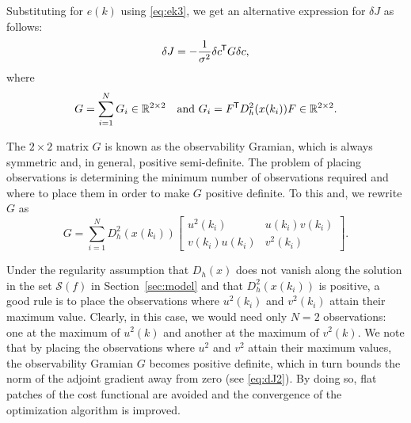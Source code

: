 \documentclass{article}
\newcommand*{\tran}{^{\mkern-1.5mu\mathsf{T}}}
\begin{document}
Substituting for $e(k)$ using \cref{eq:ek3}, we get an \textcolor{rev}{alternative} expression for $\delta J$ as follows:
\begin{equation}
    \delta J = - \dfrac{1}{\sigma^2} \delta c\tran G \delta c, \label{eq:dJ2}
\end{equation}
where
\begin{equation}
    G = \sum_{i=1}^{N} G_i \in \mathbb{R}^{2\times 2} \quad \text{and } G_i = F\tran D_h^2(x(k_i)) F \in \mathbb{R}^{2\times 2}. \label{eq:G}
\end{equation}

The $2\times 2$ matrix $G$ is known as the observability Gramian, which is always symmetric and, in general, positive semi-definite. The problem of placing observations is determining the minimum number of observations required and where to place them in \textcolor{rev}{order} to make $G$ positive definite. To this and, we rewrite $G$ as
\begin{equation}
    G = \sum_{i=1}^{N} D^2_h(x(k_i)) \begin{bmatrix} u^2(k_i) & u(k_i) v(k_i) \\ v(k_i) u(k_i) & v^2(k_i) \end{bmatrix}.
\end{equation}

Under the regularity assumption that $D_h(x)$ does not vanish along the solution in the set $\mathcal{S}(f)$ in Section~\ref{sec:model} and that $D^2_h(x(k_i))$ is positive, a good rule is to place the observations where $u^2(k_i)$ and $v^2(k_i)$ attain their maximum value. Clearly, in this case, we would need only $N=2$ observations: one at the maximum of $u^2(k)$ and another at the maximum of $v^2(k)$. We note that by placing the observations where $u^2$ and $v^2$ attain their maximum values, the observability Gramian $G$ becomes positive definite, which in turn bounds the norm of the adjoint gradient away from zero (see \cref{eq:dJ2}). By doing so, flat patches of the cost functional are avoided and the convergence of the optimization algorithm is improved.

\end{document}
